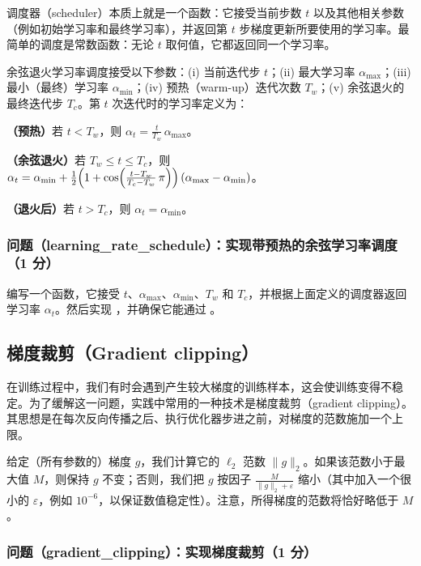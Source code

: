 调度器（scheduler）本质上就是一个函数：它接受当前步数 $t$ 以及其他相关参数（例如初始学习率和最终学习率），并返回第 $t$ 步梯度更新所要使用的学习率。最简单的调度是常数函数：无论 $t$ 取何值，它都返回同一个学习率。

余弦退火学习率调度接受以下参数：(i) 当前迭代步 $t$；(ii) 最大学习率 $\alpha_{\max}$；(iii) 最小（最终）学习率 $\alpha_{\min}$；(iv) 预热（warm-up）迭代次数 $T_w$；(v) 余弦退火的最终迭代步 $T_c$。第 $t$ 次迭代时的学习率定义为：

\textbf{（预热）}若 $t < T_w$，则 $\alpha_t = \frac{t}{T_w}\,\alpha_{\max}$。

\textbf{（余弦退火）}若 $T_w \le t \le T_c$，则 $\alpha_t = \alpha_{\min} + \frac{1}{2}\Bigl(1 + \cos\Bigl(\frac{t - T_w}{T_c - T_w}\,\pi\Bigr)\Bigr)\left(\alpha_{\max} - \alpha_{\min}\right)$。

\textbf{（退火后）}若 $t > T_c$，则 $\alpha_t = \alpha_{\min}$。

\subsubsection*{问题（learning\_rate\_schedule）：实现带预热的余弦学习率调度（1 分）}

编写一个函数，它接受 $t$、$\alpha_{\max}$、$\alpha_{\min}$、$T_w$ 和 $T_c$，并根据上面定义的调度器返回学习率 $\alpha_t$。然后实现 ，并确保它能通过 。

\subsection{梯度裁剪（Gradient clipping）}

在训练过程中，我们有时会遇到产生较大梯度的训练样本，这会使训练变得不稳定。为了缓解这一问题，实践中常用的一种技术是梯度裁剪（gradient clipping）。其思想是在每次反向传播之后、执行优化器步进之前，对梯度的范数施加一个上限。

给定（所有参数的）梯度 $g$，我们计算它的 $\ell_2$ 范数 $\|g\|_2$。如果该范数小于最大值 $M$，则保持 $g$ 不变；否则，我们把 $g$ 按因子 $\frac{M}{\|g\|_2 + \varepsilon}$ 缩小（其中加入一个很小的 $\varepsilon$，例如 $10^{-6}$，以保证数值稳定性）。注意，所得梯度的范数将恰好略低于 $M$。

\subsubsection*{问题（gradient\_clipping）：实现梯度裁剪（1 分）}

